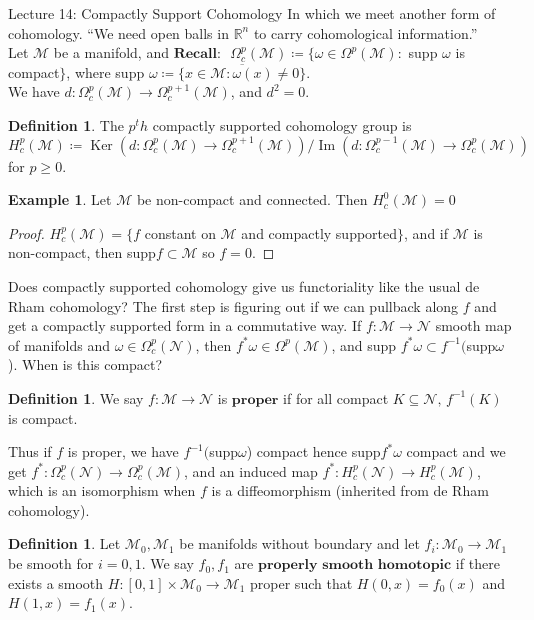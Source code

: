 \documentclass[10pt]{article}
\theoremstyle{plain}
\theoremstyle{definition}
\newtheorem{defn}[thm]{Definition} %
\newtheorem{exmp}[thm]{Example} %
\newcommand{\Recall}{\textbf{Recall: }}
\newcommand{\Real}{\mathbb{R}}
\newcommand{\man}{\mathcal{M}}
\newcommand{\nan}{\mathcal{N}}
\newcommand{\pformman}[1]{\Omega^{#1}(\man)}
\newcommand{\compactpformman}[1]{\Omega^{#1}_c(\man)}
\newcommand{\compactpformnan}[1]{\Omega^{#1}_c(\nan)}
\newcommand{\deriv}{d}
\DeclareMathOperator{\Ker}{Ker}
\DeclareMathOperator{\Ima}{Im}
\newcommand{\compactcohomman}[1]{H_c^{#1}(\man)}
\newcommand{\compactcohomnan}[1]{H_c^{#1}(\nan)}
\newcommand{\inter}{\left[0,1\right]}
\begin{document}
\begin{section}{Lecture 14: Compactly Support Cohomology}
In which we meet another form of cohomology. ``We need open balls in $\Real^n$ to carry cohomological information.''\\
Let $\man$ be a manifold, and $\Recall$ $\compactpformman{p} \coloneqq \{ \omega \in \pformman{p} : $ supp $\omega$ is compact$\}$, where supp $\omega \coloneqq \overline{\{x\in \man : \omega(x) \neq 0\}}$.\\
We have $\deriv : \compactpformman{p} \to \compactpformman{p+1}$, and $\deriv^2 = 0$.
\begin{defn}
The $p^th$ compactly supported cohomology group is 
$$H^p_c(\man) \coloneqq \Ker (d : \compactpformman{p} \to \compactpformman{p+1}) / \Ima(d : \compactpformman{p-1} \to \compactpformman{p})$$
for $p\geq 0$.
\end{defn}
\begin{exmp}
Let $\man$ be non-compact and connected. Then $H_c^0(\man) = 0$
\end{exmp}
\begin{proof}
$\compactcohomman{p} = \{ f$ constant on $\man$ and compactly supported$\}$, and if $\man$ is non-compact, then supp$f \subset \man$ so $f = 0$.
\end{proof}
Does compactly supported cohomology give us functoriality like the usual de Rham cohomology? The first step is figuring out if we can pullback along $f$ and get a compactly supported form in a commutative way. If $f:\man \to \nan$ smooth map of manifolds and $\omega \in \compactpformnan{p}$, then $f^*\omega \in \pformman{p}$, and supp $f^*\omega \subset f^{-1}($supp$\omega$). When is this compact?
\begin{defn}
We say $f:\man \to \nan $ is $\textbf{proper}$ if for all compact $K \subseteq \nan, \, f^{-1}(K)$ is compact.
\end{defn}
Thus if $f$ is proper, we have $f^{-1}($supp$\omega$) compact hence supp$f^*\omega$ compact and we get $f^*: \compactpformnan{p} \to \compactpformman{p}$, and an induced map $f^* : \compactcohomnan{p} \to \compactcohomman{p}$, which is an isomorphism when $f$ is a diffeomorphism (inherited from de Rham cohomology).
\begin{defn}
Let $\man_0, \man_1$ be manifolds without boundary and let $f_i: \man_0 \to \man_1$ be smooth for $i=0,1.$ We say $f_0,f_1$ are $\textbf{properly smooth homotopic}$ if there exists a smooth $H: \inter \times \man_0 \to \man_1$ proper such that $H(0,x) = f_0(x)$ and $H(1,x) = f_1(x)$.\\

\end{defn}
\end{section}
\end{document}
